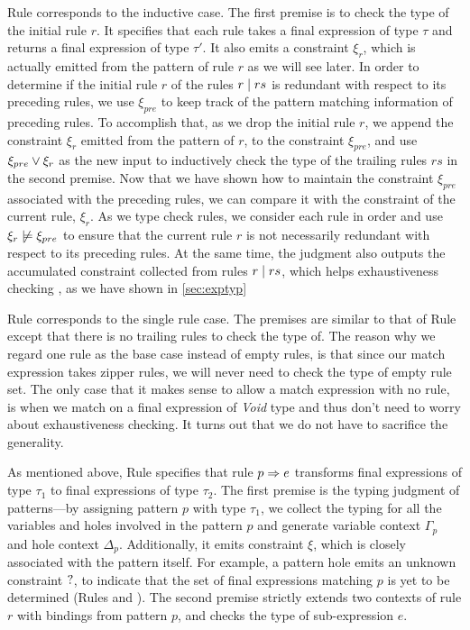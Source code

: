 Rule \TRules corresponds to the inductive case. The first premise is to check
the type of the initial rule $r$. It specifies that each rule takes a final expression
of type $\tau$ and returns a final expression of type $\tau'$. It also emits
a constraint $\xi_r$, which is actually emitted from the pattern of rule $r$ as
we will see later. In order to determine if the initial rule $r$ of the rules
$r \mid rs$ is redundant with respect to its preceding rules, we use
$\xi_{pre}$ to keep track of the pattern matching information of preceding
rules. To accomplish that, as we drop the initial rule $r$, we append the
constraint $\xi_r$ emitted from the pattern of $r$, to the constraint
$\xi_{pre}$, and use $\xi_{pre} \vee \xi_r$ as the new input to inductively check the type
of the trailing rules $rs$ in the second premise. Now that we have shown how to maintain the
constraint $\xi_{pre}$ associated with the preceding rules, we can compare it
with the constraint of the current rule, $\xi_r$. As we type check rules, we consider each rule in order and use
$\cnotsatisfy{\xi_r}{\xi_{pre}}$ to ensure that the current rule $r$ is not necessarily redundant with respect to its preceding rules. At the same time, the judgment also outputs the accumulated
constraint collected from rules $r \mid rs$, which helps exhaustiveness checking
, as we have shown in \autoref{sec:exptyp}

Rule \TOneRules corresponds to the single rule case. The premises are similar to that of Rule \TRules except that
there is no trailing rules to check the type of. The reason why we regard one
rule as the base case instead of empty rules, is that since our match expression
takes zipper rules, we will never need to check the type of empty rule set. The
only case that it makes sense to allow a match expression with no rule, is when we match on a final expression of \textit{Void} type and thus
don't need to worry about exhaustiveness checking. It turns out that we do not
have to sacrifice the generality.

As mentioned above, Rule \TRule specifies that rule
$p \Rightarrow e$ transforms final expressions of type $\tau_1$ to final expressions
of type $\tau_2$. The first premise is the typing judgment of patterns---by
assigning pattern $p$ with type $\tau_1$, we collect the typing for all the
variables and holes involved in the pattern $p$ and generate variable context
$\Gamma_p$ and hole context $\Delta_p$. Additionally, it emits constraint $\xi$,
which is closely associated with the pattern itself. For example, a pattern hole emits an 
unknown constraint $\mathtt{?}$, to indicate that the set of final expressions
matching $p$ is yet to be determined (Rules \PTEHole and \PTHole). The second premise strictly extends two contexts of
rule $r$ with bindings from pattern $p$, and checks the type of
sub-expression $e$.

